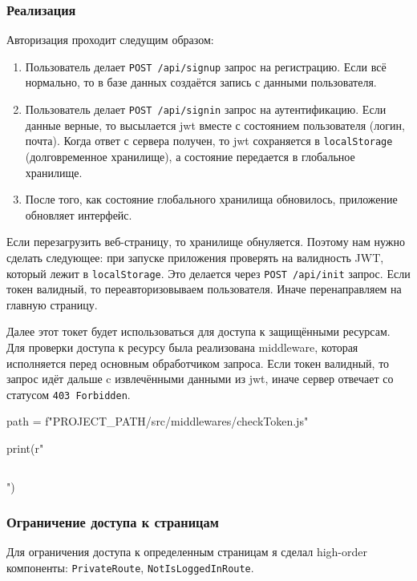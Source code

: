 \subsubsection{Реализация}
Авторизация проходит следущим образом:
\begin{enumerate}
    \item Пользователь делает \texttt{POST /api/signup} запрос на регистрацию. Если всё нормально, то в базе данных создаётся запись с данными пользователя.
    \item Пользователь делает \texttt{POST /api/signin} запрос на аутентификацию. Если данные верные, то высылается \acrshort{jwt} вместе с состоянием пользователя (логин, почта). Когда ответ с сервера получен, то \acrshort{jwt} сохраняется в \texttt{localStorage} (долговременное хранилище), а состояние передается в глобальное \textcite{redux} хранилище.
    \item После того, как состояние глобального хранилища обновилось, приложение обновляет интерфейс.
\end{enumerate}

Если перезагрузить веб-страницу, то \textcite{redux} хранилище обнуляется. Поэтому нам нужно сделать следующее: при запуске приложения проверять на валидность JWT, который лежит в \texttt{localStorage}. Это делается через \texttt{POST /api/init} запрос. Если токен валидный, то переавторизовываем пользователя. Иначе перенаправляем на главную страницу.

Далее этот токет будет использоваться для доступа к защищёнными ресурсам. Для проверки доступа к ресурсу была реализована middleware, которая исполняется перед основным обработчиком запроса. Если токен валидный, то запрос идёт дальше c извлечёнными данными из \acrshort{jwt}, иначе сервер отвечает со статусом \texttt{403 Forbidden}.

\begin{pycode}
path = f"{PROJECT_PATH}/src/middlewares/checkToken.js"

print(r"\inputminted{js}{" + path + r"}")
\end{pycode}

\subsubsection{Ограничение доступа к страницам}
Для ограничения доступа к определенным страницам я сделал high-order компоненты: \texttt{PrivateRoute}, \texttt{NotIsLoggedInRoute}.


